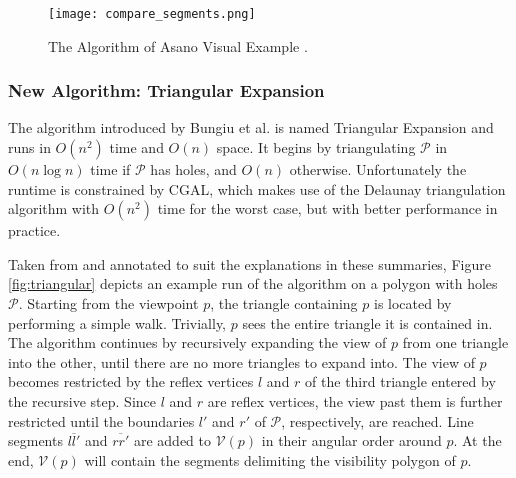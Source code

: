 \begin{figure}[h!]
	\centering
	\texttt{[image: compare\_segments.png]}
	\caption{The Algorithm of Asano \cite{asano1985efficient} Visual Example \cite{DBLP:journals/corr/BungiuHHHK14}.}
	\label{fig:asano}
\end{figure}

\subsubsection{New Algorithm: Triangular Expansion}
The algorithm introduced by Bungiu et al. \cite{DBLP:journals/corr/BungiuHHHK14} is named Triangular Expansion and runs in $O(n^2)$ time and $O(n)$ space. It begins by triangulating $\mathcal P$ in $O(n \log n)$ time if $\mathcal P$ has holes, and $O(n)$ otherwise. Unfortunately the runtime is constrained by CGAL, which makes use of the Delaunay triangulation algorithm \cite{delaunay1934sphere} with $O(n^2)$ time for the worst case, but with better performance in practice. 

Taken from \cite{DBLP:journals/corr/BungiuHHHK14} and annotated to suit the explanations in these summaries, Figure \ref{fig:triangular} depicts an example run of the algorithm on a polygon with holes $\mathcal P$. Starting from the viewpoint $p$, the triangle containing $p$ is located by performing a simple walk. Trivially, $p$ sees the entire triangle it is contained in. The algorithm continues by recursively expanding the view of $p$ from one triangle into the other, until there are no more triangles to expand into. The view of $p$ becomes restricted by the reflex vertices $l$ and $r$ of the third triangle entered by the recursive step. Since $l$ and $r$ are reflex vertices, the view past them is further restricted until the boundaries $l'$ and $r'$ of $\mathcal P$, respectively,  are reached. Line segments $\overline{ll'}$ and $\overline{rr'}$ are added to $\mathcal V(p)$ in their angular order around $p$. At the end, $\mathcal V(p)$ will contain the segments delimiting the visibility polygon of $p$.

